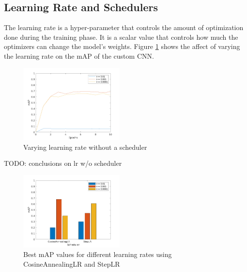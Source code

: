 \documentclass[10pt,twocolumn,letterpaper]{article}
\begin{document}
\subsection{Learning Rate and Schedulers}

The learning rate is a hyper-parameter that controls the amount of optimization done during the training phase.
It is a scalar value that controls how much the optimizers can change the model's weights.
Figure \ref{fig:learning_rate_comparison} shows the affect of varying the learning rate on the mAP of the
custom CNN.


\begin{figure}[H]
  \begin{center}
    \includegraphics[width=0.47\textwidth]{./assets/learning_rate_comparison.png}
    \captionsetup{justification=centering}
    \caption{Varying learning rate without a scheduler}
    \label{fig:learning_rate_comparison}
  \end{center}
\end{figure}

TODO: conclusions on lr w/o scheduler


\begin{figure}[H]
  \begin{center}
    \includegraphics[width=0.47\textwidth]{./assets/learning_rate_w_scheduler_comparison.png}
    \captionsetup{justification=centering}
    \caption{Best mAP values for different learning rates using CosineAnnealingLR and StepLR}
    \label{fig:learning_rate_w_scheduler}
  \end{center}
\end{figure}
\end{document}
